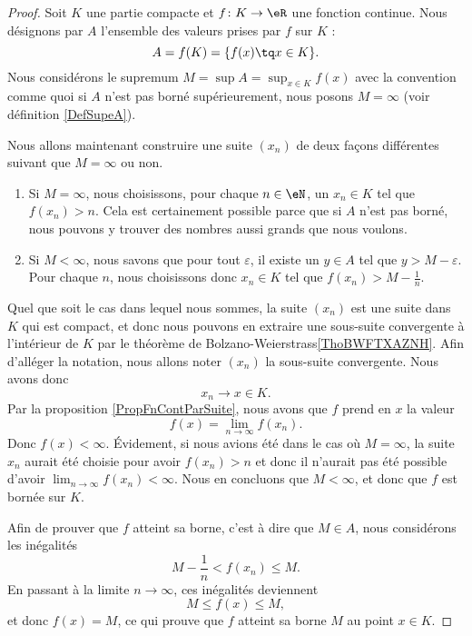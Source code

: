 \begin{proof}
	Soit $K$ une partie compacte et $f\colon K\to \eR$ une fonction continue. Nous désignons par $A$ l'ensemble des valeurs prises par $f$ sur $K$ :
	\begin{equation}
		A=f(K)=\{ f(x)\tq x\in K \}.
	\end{equation}
	Nous considérons le supremum $M=\sup A=\sup_{x\in K}f(x)$ avec la convention comme quoi si $A$ n'est pas borné supérieurement, nous posons $M=\infty$ (voir définition \ref{DefSupeA}).

	Nous allons maintenant construire une suite $(x_n)$ de deux façons différentes suivant que $M=\infty$ ou non.
	\begin{enumerate}
		\item
			Si $M=\infty$, nous choisissons, pour chaque $n\in\eN$, un $x_n\in K$ tel que $f(x_n)>n$. Cela est certainement possible parce que si $A$ n'est pas borné, nous pouvons y trouver des nombres aussi grands que nous voulons.
		\item
			Si $M<\infty$, nous savons que pour tout $\varepsilon$, il existe un $y\in A$ tel que $y>M-\varepsilon$. Pour chaque $n$, nous choisissons donc $x_n\in K$ tel que $f(x_n)>M-\frac{1}{ n }$.
	\end{enumerate}
    Quel que soit le cas dans lequel nous sommes, la suite $(x_n)$ est une suite dans $K$ qui est compact, et donc nous pouvons en extraire une sous-suite convergente à l'intérieur de \( K\) par le théorème de Bolzano-Weierstrass\ref{ThoBWFTXAZNH}. Afin d'alléger la notation, nous allons noter $(x_n)$ la sous-suite convergente. Nous avons donc 
	\begin{equation}
		x_n\to x\in K.
	\end{equation}
	Par la proposition \ref{PropFnContParSuite}, nous avons que $f$ prend en \( x\) la valeur
	\begin{equation}
		f(x)=\lim_{n\to \infty} f(x_n).
	\end{equation}
	Donc $f(x)<\infty$. Évidement, si nous avions été dans le cas où $M=\infty$, la suite $x_n$ aurait été choisie pour avoir $f(x_n)>n$ et donc il n'aurait pas été possible d'avoir $\lim_{n\to \infty} f(x_n)<\infty$. Nous en concluons que $M<\infty$, et donc que $f$ est bornée sur $K$.

	Afin de prouver que $f$ atteint sa borne, c'est à dire que $M\in A$, nous considérons les inégalités
	\begin{equation}
		M-\frac{1}{ n }<f(x_n)\leq M.
	\end{equation}
	En passant à la limite $n\to \infty$, ces inégalités deviennent
	\begin{equation}
		M\leq f(x)\leq M,
	\end{equation}
	et donc $f(x)=M$, ce qui prouve que $f$ atteint sa borne $M$ au point $x\in K$.
\end{proof}


